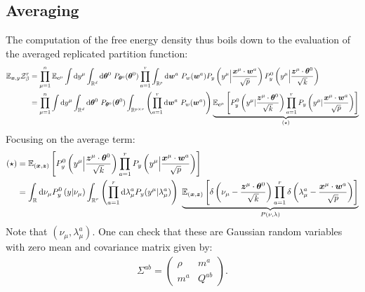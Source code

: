 \documentclass[11pt]{article}
\numberwithin{equation}{section}
\begin{document}
\subsection*{Averaging}
The computation of the free energy density thus boils down to the evaluation of the averaged replicated partition function:
\begin{align}
\mathbb{E}_{\bm{x},y}\mathcal{Z}^{r}_{\beta} &= \prod\limits_{\mu=1}^{n}\mathbb{E}_{\bm{c}^{\mu}}\int\text{d} y^{\mu}\int_{\mathbb{R}^{d}}\text{d}\bm{\theta}^{0}~P_{\bm{\theta}^{0}}(\bm{\theta}^{0})	\prod\limits_{a=1}^{r}\int_{\mathbb{R}^{p}}\text{d}\bm{w}^{a}~P_{w}(\bm{w}^{a})P_{y}\left(y^{\mu}\Big|\frac{\bm{x}^{\mu}\cdot \bm{w}^{a}}{\sqrt{p}}\right)P^{0}_{y}\left(y^{\mu}\Big|\frac{\bm{z}^{\mu}\cdot\bm{\theta}^{0}}{\sqrt{k}}\right)\notag\\
&=\prod\limits_{\mu=1}^{n}\int\text{d} y^{\mu}\int_{\mathbb{R}^{d}}\text{d}\bm{\theta}^{0}~P_{\bm{\theta}^{0}}(\bm{\theta}^{0})	\int_{\mathbb{R}^{p\times r}}\left(\prod\limits_{a=1}^{r}\text{d}\bm{w}^{a}~P_{w}(\bm{w}^{a})\right)\underbrace{\mathbb{E}_{\bm{c}^{\mu}}\left[P^{0}_{y}\left(y^{\mu}|\frac{\bm{z}^{\mu}\cdot\bm{\theta}^{0}}{\sqrt{k}}\right)\prod\limits_{a=1}^{r}P_{y}\left(y^{\mu}|\frac{\bm{x}^{\mu}\cdot\bm{w}^{a}}{\sqrt{p}}\right)\right]}_{(\star)}
\end{align}
Focusing on the average term:
\begin{align}
	(\star) &= \mathbb{E}_{(\bm{x},\bm{z})}\left[P^{0}_{y}\left(y^{\mu}\Big|\frac{\bm{z}^{\mu}\cdot\bm{\theta}^{0}}{\sqrt{k}}\right)\prod\limits_{a=1}^{r}P_{y}\left(y^{\mu}\Big|\frac{\bm{x}^{\mu}\cdot\bm{w}^{a}}{\sqrt{p}}\right)\right]\notag\\ 
	&= \int_{\mathbb{R}}\text{d}\nu_{\mu}P_{y}^{0}\left(y|\nu_{\mu}\right)\int_{\mathbb{R}^{r}}\left(\prod\limits_{a=1}^{r}\text{d}\lambda^{a}_{\mu}P_{y}(y^{\mu}|\lambda_{\mu}^{a})\right)~\underbrace{\mathbb{E}_{(\bm{x},\bm{z})}\left[\delta\left(\nu_{\mu}-\frac{\bm{z}^{\mu}\cdot\bm{\theta}^{0}}{\sqrt{k}}\right)\prod\limits_{a=1}^{r}\delta\left(\lambda^{a}_{\mu}-\frac{\bm{x}^{\mu}\cdot\bm{w}^{a}}{\sqrt{p}}\right)\right]}_{P(\nu,\lambda)}\notag
\end{align}
Note that $(\nu_{\mu},\lambda^{a}_{\mu})$. One can check that these are Gaussian random variables with zero mean and covariance matrix given by:
\begin{align}
\Sigma^{ab} = 
\begin{pmatrix}
 	\rho & m^{a}\\
 	m^{a} & Q^{ab}
\end{pmatrix}.
\end{align}
\end{document}
